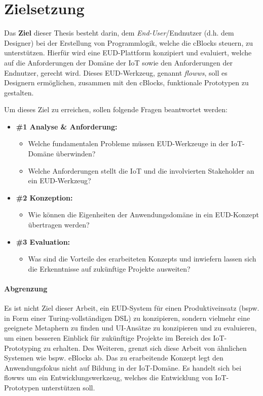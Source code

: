\section{Zielsetzung}\label{sec:1_zielsetzung}
Das \textbf{Ziel} dieser Thesis besteht darin, dem \textit{End-User}/Endnutzer (d.h. dem Designer) bei der Erstellung von Programmlogik, welche die \acp{cBlock} steuern, zu unterstützen. Hierfür wird eine \ac{EUD}-Plattform konzipiert und evaluiert, welche auf die Anforderungen der Domäne der \ac{IoT} sowie den Anforderungen der Endnutzer, gerecht wird. Dieses \ac{EUD}-Werkzeug, genannt \textit{flowws}, soll es Designern ermöglichen, zusammen mit den \acp{cBlock}, funktionale Prototypen zu gestalten.

Um dieses Ziel zu erreichen, sollen folgende Fragen beantwortet werden:
\begin{itemize}
    \item \textbf{\#1 Analyse \& Anforderung:} 
    \begin{itemize}
        \item Welche fundamentalen Probleme müssen \ac{EUD}-Werkzeuge in der \ac{IoT}-Domäne überwinden?
        \item Welche Anforderungen stellt die \ac{IoT} und die involvierten Stakeholder an ein \ac{EUD}-Werkzeug?
    \end{itemize}
        \item \textbf{\#2 Konzeption:} 
    \begin{itemize}
        \item Wie können die Eigenheiten der Anwendungsdomäne in ein \ac{EUD}-Konzept übertragen werden?
    \end{itemize}
        \item \textbf{\#3 Evaluation:} 
    \begin{itemize}
        \item Was sind die Vorteile des erarbeiteten Konzepts und inwiefern lassen sich die Erkenntnisse auf zukünftige Projekte ausweiten?
    \end{itemize}
\end{itemize}

\paragraph{Abgrenzung} Es ist nicht Ziel dieser Arbeit, ein \ac{EUD}-System für einen Produktiveinsatz (bspw. in Form einer Turing-vollständigen \ac{DSL}) zu konzipieren, sondern vielmehr eine geeignete Metaphern zu finden und \ac{UI}-Ansätze zu konzipieren und zu evaluieren, um einen besseren Einblick für zukünftige Projekte im Bereich des \ac{IoT}-Prototyping zu erhalten. Des Weiteren, grenzt sich diese Arbeit von ähnlichen Systemen wie bspw. eBlocks \cite{Phalke.2010} ab. Das zu erarbeitende Konzept legt den Anwendungsfokus nicht auf Bildung in der \ac{IoT}-Domäne. Es handelt sich bei flowws um ein Entwicklungswerkzeug, welches die Entwicklung von \ac{IoT}-Prototypen unterstützen soll.

